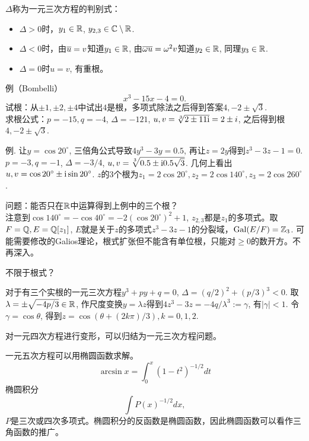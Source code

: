 $\Delta$称为一元三次方程的判别式：
\begin{itemize}
    \item $\Delta>0$时，$y_1\in\mathbb{R}$, $y_{2,3}\in\mathbb{C}\setminus\mathbb{R}$.
    \item $\Delta<0$时，由$\overline{u}=v$知道$y_1\in\mathbb{R}$, 由$\overline{\omega u}=\omega^2 v$知道$y_2\in\mathbb{R}$, 同理$y_3\in\mathbb{R}$.
    \item $\Delta=0$时$u=v$, 有重根。
\end{itemize}
例（Bombelli）
\begin{equation*}
    x^3-15x-4=0.
\end{equation*}
试根：从$\pm 1,\pm 2,\pm 4$中试出$4$是根，多项式除法之后得到答案$4,-2\pm\sqrt{3}$.\\
求根公式：$p=-15,q=-4$, $\Delta=-121$, $u,v=\sqrt[3]{2\pm 11\mathrm{i}}=2\pm i$, 之后得到根$4,-2\pm\sqrt{3}$.

例. 让$y=\cos 20^\circ$, 三倍角公式导致$4y^3-3y=0.5$, 再让$z=2y$得到$z^3-3z-1=0$. $p=-3,q=-1$, $\Delta=-3/4$, $u,v=\sqrt[3]{0.5\pm\mathrm{i} 0.5\sqrt{3}}$. 几何上看出$u,v=\cos 20^\circ\pm \mathrm{i}\sin 20^\circ$. $z$的3个根为$z_1=2\cos 20^\circ,z_2=2\cos 140^\circ,z_3=2\cos 260^\circ$.

问题：能否只在$\mathbb{R}$中运算得到上例中的三个根？\\
注意到$\cos 140^\circ=-\cos 40^\circ=-2(\cos 20^\circ)^2+1$, $z_{2,3}$都是$z_1$的多项式。取$F=\mathbb{Q},E=\mathbb{Q}[z_1]$, $E$就是关于$z$的多项式$z^3-3z-1$的分裂域，$\operatorname{Gal} (E/F)=\mathbb{Z}_3$. 可能需要修改的Galios理论，根式扩张但不能含有单位根，只能对$\geqslant 0$的数开方。不再深入。

不限于根式？

对于有三个实根的一元三次方程$y^3+py+q=0$, $\Delta=(q/2)^2+(p/3)^3<0$. 取$\lambda=\pm\sqrt{-4p/3}\in\mathbb{R}$, 作尺度变换$y=\lambda z$得到$4z^3-3z=-4q/\lambda^3:=\gamma$, 有$|\gamma|<1$. 令$\gamma=\cos\theta$, 得到$z=\cos (\theta+(2k\pi)/3),k=0,1,2$.

对一元四次方程进行变形，可以归结为一元三次方程问题。

一元五次方程可以用椭圆函数求解。
\begin{equation*}
    \arcsin x=\int_{0}^{x}(1-t^2)^{-1/2}dt
\end{equation*}
椭圆积分
\begin{equation*}
    \int P(x)^{-1/2}dx,
\end{equation*}
$P$是三次或四次多项式。椭圆积分的反函数是椭圆函数，因此椭圆函数可以看作三角函数的推广。

